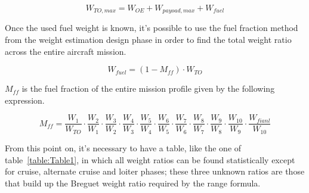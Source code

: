 \begin{equation}
W_{TO,max}=W_{OE}+W_{payoad,max}+W_{fuel}
\label{eqn:Equation1.3}
\end{equation}

\bigskip
\noindent
Once the used fuel weight is known, it’s possible to use the fuel fraction method from the weight estimation design phase in order to find the total weight ratio across the entire aircraft mission. 

\begin{equation}
W_{fuel}=\left(1-M_{ff}\right)\cdot W_{TO}
\label{eqn:Equation1.4}
\end{equation}

\bigskip
\noindent
$M_{ff}$ is the fuel fraction of the entire mission profile given by the following expression.

\bigskip
\begin{equation}
M_{ff}=\frac{W_1}{W_{TO}}\cdot 
	   \frac{W_2}{W_{1}}\cdot
	   \frac{W_3}{W_{2}}\cdot 
	   \frac{W_4}{W_{3}}\cdot 
	   \frac{W_5}{W_{4}}\cdot 
	   \frac{W_6}{W_{5}}\cdot 
	   \frac{W_7}{W_{6}}\cdot 
	   \frac{W_8}{W_{7}}\cdot 
	   \frac{W_9}{W_{8}}\cdot 
	   \frac{W_{10}}{W_{9}}\cdot 
	   \frac{W_{fianl}}{W_{10}} 
	   \label{eqn:Equation1.5} 
\end{equation}

\bigskip
\noindent
From this point on, it’s necessary to have a table, like the one of table~\ref{table:Table1}, in which all weight ratios can be found statistically except for cruise, alternate cruise and loiter phases; these three unknown ratios are those that build up the Breguet weight ratio required by the range formula.   

